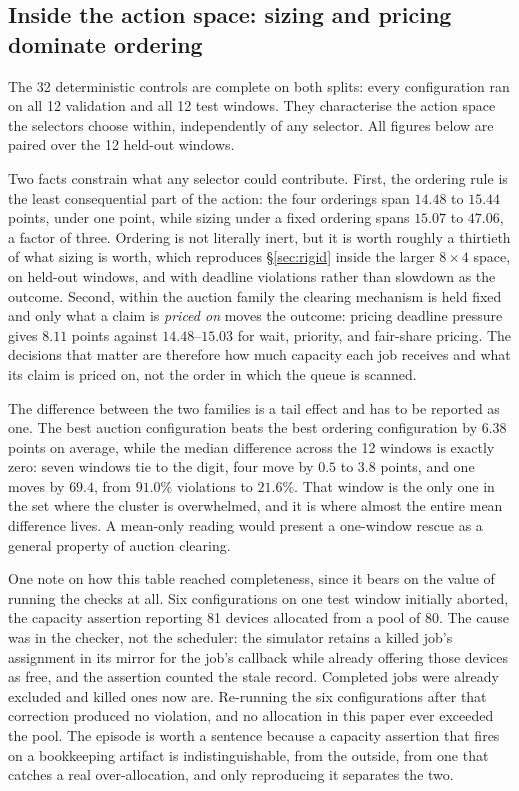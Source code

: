 \documentclass[conference]{IEEEtran}
\begin{document}
\subsection{Inside the action space: sizing and pricing dominate ordering}
\label{sec:controls}

The 32 deterministic controls are complete on both splits: every configuration ran on all 12 validation
and all 12 test windows.  They characterise the action space the selectors choose within, independently
of any selector.  All figures below are paired over the 12 held-out windows.


Two facts constrain what any selector could contribute.  First, the ordering rule is the least
consequential part of the action: the four orderings span $14.48$ to $15.44$ points, under one point,
while sizing under a fixed ordering spans $15.07$ to $47.06$, a factor of three.  Ordering is not
literally inert, but it is worth roughly a thirtieth of what sizing is worth, which reproduces
\S\ref{sec:rigid} inside the larger $8\times4$ space, on held-out windows, and with deadline
violations rather than slowdown as the outcome.  Second, within the auction family the clearing
mechanism is held fixed and only what a claim is \emph{priced on} moves the outcome: pricing deadline
pressure gives $8.11$ points against $14.48$--$15.03$ for wait, priority, and fair-share pricing.  The
decisions that matter are therefore how much capacity each job receives and what its claim is priced
on, not the order in which the queue is scanned.

The difference between the two families is a tail effect and has to be reported as one.  The best
auction configuration beats the best ordering configuration by $6.38$ points on average, while the
median difference across the 12 windows is exactly zero: seven windows tie to the digit, four move by
$0.5$ to $3.8$ points, and one moves by $69.4$, from $91.0\%$ violations to $21.6\%$.  That window is
the only one in the set where the cluster is overwhelmed, and it is where almost the entire mean
difference lives.  A mean-only reading would present a one-window rescue as a general property of
auction clearing.

One note on how this table reached completeness, since it bears on the value of running the checks at
all.  Six configurations on one test window initially aborted, the capacity assertion reporting 81
devices allocated from a pool of 80.  The cause was in the checker, not the scheduler: the simulator
retains a killed job's assignment in its mirror for the job's callback while already offering those
devices as free, and the assertion counted the stale record.  Completed jobs were already excluded and
killed ones now are.  Re-running the six configurations after that correction produced no violation,
and no allocation in this paper ever exceeded the pool.  The episode is worth a sentence because a
capacity assertion that fires on a bookkeeping artifact is indistinguishable, from the outside, from
one that catches a real over-allocation, and only reproducing it separates the two.
\end{document}
